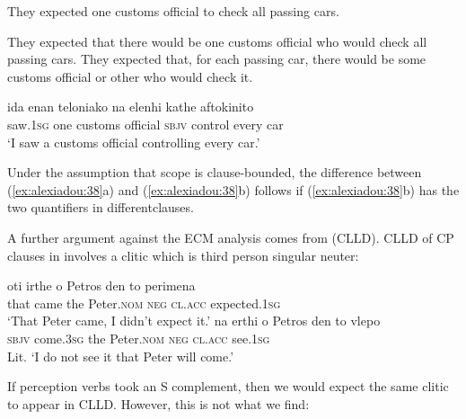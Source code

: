 \documentclass[output=paper]{langsci/langscibook}
\begin{document}
\ea%
    \label{ex:alexiadou:38}
    \ea They expected one customs official to check all passing cars.\\
    \begin{xlisti}
    \ex They expected that there would be one customs official who would         check all passing cars.
    \ex They expected that, for each passing car, there would be some           customs official or other who would check it.  
    \end{xlisti}
    \ex 
    \gll ida          enan teloniako            na       elenhi   kathe  aftokinito\\
        saw{}.\textsc{1sg}   one   {customs official}  \textsc{sbjv} control  every  car\\
    \glt ‘I saw a customs official controlling every car.’
    \begin{xlisti}
    \end{xlisti}
    \z
\z

Under the assumption that  scope is clause-bounded, the difference between (\ref{ex:alexiadou:38}a) and (\ref{ex:alexiadou:38}b) follows if (\ref{ex:alexiadou:38}b) has the two quantifiers in different\linebreak clauses. 

  A further argument against the ECM analysis comes from  (CLLD). CLLD of CP clauses in  involves a clitic which is third person singular neuter:

\ea%
    \label{ex:alexiadou:39}
    \ea
    \gll oti   irthe   o     Petros      den  to       perimena\\
          that  came the  Peter.\textsc{nom}  \textsc{neg}  \textsc{cl.acc} expected{}.\textsc{1sg}\\
    \glt ‘That Peter came, I didn't expect it.’
    \ex
    \gll na    erthi         o   Petros       den   to      vlepo\\
         \textsc{sbjv} come{}.\textsc{3sg} the Peter.\textsc{nom}  \textsc{neg}  \textsc{cl.acc} see{}.\textsc{1sg}\\
    \glt Lit. ‘I do not see it that Peter will come.’
    \z
\z    
 
If perception verbs took an S complement, then we would expect the same clitic to appear in CLLD. However, this is not what we find:
\end{document}
